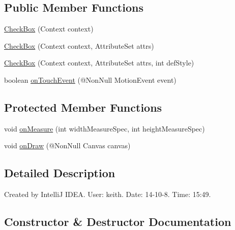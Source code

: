 \subsection*{Public Member Functions}
\begin{DoxyCompactItemize}
\item 
\hyperlink{classcom_1_1material_1_1widget_1_1_check_box_a411634cdcd0771bc216ee16876f5d82f}{Check\+Box} (Context context)
\item 
\hyperlink{classcom_1_1material_1_1widget_1_1_check_box_a1c76f65d04f033b9e89779a2a23d3cb4}{Check\+Box} (Context context, Attribute\+Set attrs)
\item 
\hyperlink{classcom_1_1material_1_1widget_1_1_check_box_a11cb8eed49ec971f92fad02764d7386a}{Check\+Box} (Context context, Attribute\+Set attrs, int def\+Style)
\item 
boolean \hyperlink{classcom_1_1material_1_1widget_1_1_check_box_aca0d1ec16bf2552654f2222c84b070c4}{on\+Touch\+Event} (@Non\+Null Motion\+Event event)
\end{DoxyCompactItemize}
\subsection*{Protected Member Functions}
\begin{DoxyCompactItemize}
\item 
void \hyperlink{classcom_1_1material_1_1widget_1_1_check_box_a22b583e5550f9934e0ca2121f8b10b37}{on\+Measure} (int width\+Measure\+Spec, int height\+Measure\+Spec)
\item 
void \hyperlink{classcom_1_1material_1_1widget_1_1_check_box_a4fe7e27e911af1a0b2428c252a6c4661}{on\+Draw} (@Non\+Null Canvas canvas)
\end{DoxyCompactItemize}


\subsection{Detailed Description}
Created by IntelliJ I\+D\+EA. User\+: keith. Date\+: 14-\/10-\/8. Time\+: 15\+:49. 

\subsection{Constructor \& Destructor Documentation}
\mbox{\label{classcom_1_1material_1_1widget_1_1_check_box_a411634cdcd0771bc216ee16876f5d82f}} 
